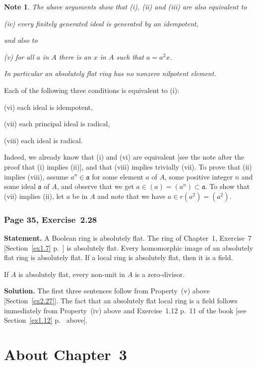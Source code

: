 \documentclass[12pt,letterpaper]{article}%
\newcommand{\mf}{\mathfrak}
\newcommand{\aaa}{\mf a}
\newcommand{\nn}{\noindent}
\newtheorem{note}[thm]{Note}
\begin{document}
\begin{note}
The above arguments show that \emph{(i)}, \emph{(ii)} and \emph{(iii)} are also equivalent to

\emph{(iv)} every finitely generated ideal is generated by an idempotent,

\nn and also to 

\emph{(v)} for all $a$ in $A$ there is an $x$ in $A$ such that $a=a^2x$. 

\nn In particular an absolutely flat ring has no nonzero nilpotent element. 
\end{note}

Each of the following three conditions is equivalent to (i):

\nn(vi) each ideal is idempotent,

\nn(vii) each principal ideal is radical,

\nn(viii) each ideal is radical.

Indeed, we already know that (i) and (vi) are equivalent [see the note after the proof that (i) implies (ii)], and that (viii) implies trivially (vii). To prove that (ii) implies (viii), assume $a^n\in\aaa$ for some element $a$ of $A$, some positive integer $n$ and some ideal $\aaa$ of $A$, and observe that we get $a\in(a)=(a^n)\subset\aaa$. To show that (vii) implies (ii), let $a$ be in $A$ and note that we have $a\in r(a^2)=(a^2)$.

\subsubsection{Page 35, Exercise~2.28}\label{ex2.28}%

\textbf{Statement.} A Boolean ring is absolutely flat. The ring of Chapter~1, Exercise~7 [Section~\ref{ex1.7} p.~\pageref{ex1.7}] is absolutely flat. Every homomorphic image of an absolutely flat ring is absolutely flat. If a local ring is absolutely flat, then it is a field.

If $A$ is absolutely flat, every non-unit in $A$ is a zero-divisor.

\nn\textbf{Solution.} The first three sentences follow from Property~(v) above [Section~\ref{ex2.27}]. The fact that an absolutely flat local ring is a field follows immediately from Property~(iv) above and Exercise~1.12 p.~11 of the book [see Section~\ref{ex1.12} p.~\pageref{ex1.12} above].

\newpage

\section{About Chapter~3}%
\end{document}
